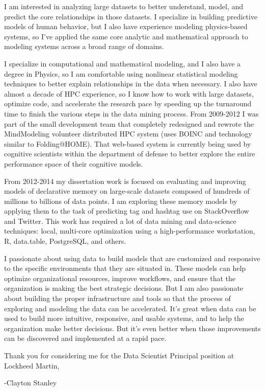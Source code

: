 \documentclass{article}
\begin{document}
I am interested in analyzing large datasets to better understand, model, and predict the core relationships in those datasets.
I specialize in building predictive models of human behavior, but I also have experience modeling physics-based systems,
so I've applied the same core analytic and mathematical approach to modeling systems across a broad range of domains.

I specialize in computational and mathematical modeling, and I also have a degree in Physics, so I am comfortable using nonlinear statistical modeling techniques to better explain relationships in the data when necessary.
I also have almost a decade of HPC experience, so I know how to work with large datasets, optimize code,
and accelerate the research pace by speeding up the turnaround time to finish the various steps in the data mining process. 
From 2009-2012 I was part of the small development team that completely redesigned and rewrote the MindModeling volunteer distributed HPC system (uses BOINC and technology similar to Folding@HOME).
That web-based system is currently being used by cognitive scientists within the department of defense to better explore the entire performance space of their cognitive models.

From 2012-2014 my dissertation work is focused on evaluating and improving models of declarative memory on large-scale datasets composed of hundreds of millions to billions of data points.
I am exploring these memory models by applying them to the task of predicting tag and hashtag use on StackOverflow and Twitter.
This work has required a lot of data mining and data-science techniques: local, multi-core optimization using a high-performance workstation, R, data.table, PostgreSQL, and others.

I passionate about using data to build models that are customized and responsive to the specific environments that they are situated in.
These models can help optimize organizational resources, improve workflows, and ensure that the organization is making the best strategic decisions.
But I am also passionate about building the proper infrastructure and tools so that the process of exploring and modeling the data can be accelerated.
It's great when data can be used to build more intuitive, responsive, and usable systems, and to help the organization make better decisions.
But it's even better when those improvements can be discovered and implemented at a rapid pace.

Thank you for considering me for the Data Scientist Principal position at Lockheed Martin,

-Clayton Stanley
\end{document}
